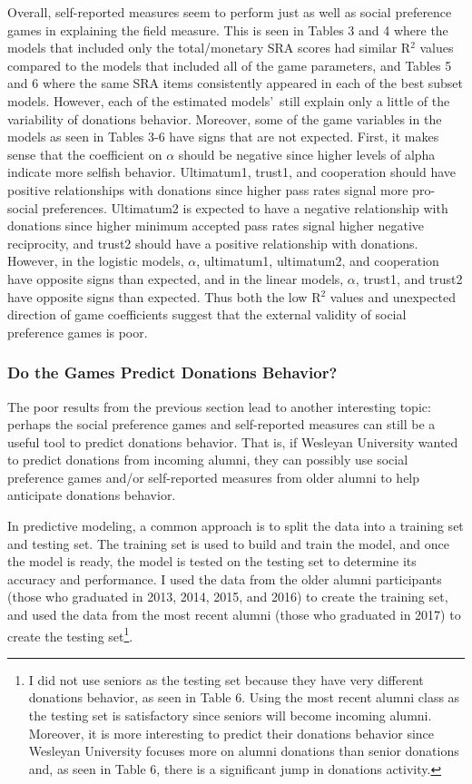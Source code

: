 \documentclass[12pt]{article}
\begin{document}
Overall, self-reported measures seem to perform just as well as social preference games in explaining the field measure. This is seen in Tables 3 and 4 where the models that included only the total/monetary SRA scores had similar R$^2$ values compared to the models that included all of the game parameters, and Tables 5 and 6 where the same SRA items consistently appeared in each of the best subset models. However, each of the estimated models\rq \ still explain only a little of the variability of donations behavior. Moreover, some of the game variables in the models as seen in Tables 3-6 have signs that are not expected. First, it makes sense that the coefficient on \(\alpha\) should be negative since higher levels of alpha indicate more selfish behavior. Ultimatum1, trust1, and cooperation should have positive relationships with donations since higher pass rates signal more pro-social preferences. Ultimatum2 is expected to have a negative relationship with donations since higher minimum accepted pass rates signal higher negative reciprocity, and trust2 should have a positive relationship with donations. However, in the logistic models, \(\alpha\), ultimatum1, ultimatum2, and cooperation have opposite signs than expected, and in the linear models, \(\alpha\), trust1, and trust2 have opposite signs than expected. Thus both the low R$^{2}$ values and unexpected direction of game coefficients suggest that the external validity of social preference games is poor.

\subsubsection{Do the Games Predict Donations Behavior?}

The poor results from the previous section lead to another interesting topic: perhaps the social preference games and self-reported measures can still be a useful tool to predict donations behavior. That is, if Wesleyan University wanted to predict donations from incoming alumni, they can possibly use social preference games and/or self-reported measures from older alumni to help anticipate donations behavior.

In predictive modeling, a common approach is to split the data into a training set and testing set. The training set is used to build and train the model, and once the model is ready, the model is tested on the testing set to determine its accuracy and performance. I used the data from the older alumni participants (those who graduated in 2013, 2014, 2015, and 2016) to create the training set, and used the data from the most recent alumni (those who graduated in 2017) to create the testing set\footnote{I did not use seniors as the testing set because they have very different donations behavior, as seen in Table 6. Using the most recent alumni class as the testing set is satisfactory since seniors will become incoming alumni. Moreover, it is more interesting to predict their donations behavior since Wesleyan University focuses more on alumni donations than senior donations and, as seen in Table 6, there is a significant jump in donations activity.}. 
\end{document}
